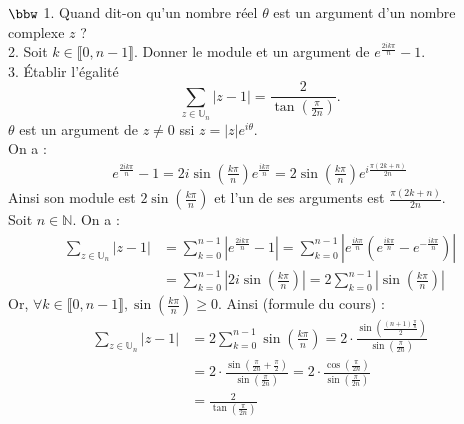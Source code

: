 \documentclass[11pt]{article}
\begin{document}
\pagebreak

\begin{exercice}{$\bbw$}{}
    1. Quand dit-on qu'un nombre réel $\theta$ est un argument d'un nombre complexe $z$ ?\\
    2. Soit $k\in\llbracket0,n-1\rrbracket$. Donner le module et un argument de $e^{\frac{2ik\pi}{n}}-1$.\\
    3. Établir l'égalité
    \begin{equation*}
        \sum_{z\in\mathbb{U}_n}{|z-1|}=\frac{2}{\tan\left( \frac{\pi}{2n} \right)}.
    \end{equation*}
    \tcblower
     $\theta$ est un argument de $z\neq0$ ssi $z=|z|e^{i\theta}$.\\
     On a :
    \begin{align*}
        e^{\frac{2ik\pi}{n}}-1=2i\sin\left( \frac{k\pi}{n} \right)e^{\frac{ik\pi}{n}}=2\sin\left( \frac{k\pi}{n} \right)e^{i\frac{\pi(2k+n)}{2n}}
    \end{align*}
    Ainsi son module est $2\sin\left( \frac{k\pi}{n} \right)$ et l'un de ses arguments est $\frac{\pi(2k+n)}{2n}$.\\
     Soit $n\in\mathbb{N}$. On a :
    \begin{align*}
        \sum_{z\in\mathbb{U}_n}{|z-1|}&=\sum_{k=0}^{n-1}{|e^{\frac{2ik\pi}{n}}-1|} = \sum_{k=0}^{n-1}{|e^{\frac{ik\pi}{n}}\left( e^{\frac{ik\pi}{n}} - e^{-\frac{ik\pi}{n}} \right)|}\\
        &=\sum_{k=0}^{n-1}{\left|2i\sin\left( \frac{k\pi}{n} \right)\right|} = 2\sum_{k=0}^{n-1}{\left|\sin\left( \frac{k\pi}{n} \right)\right|}
    \end{align*}
    Or, $\forall{k\in\llbracket0,n-1\rrbracket}, \sin\left( \frac{k\pi}{n} \right) \geq 0$. Ainsi (formule du cours) :
    \begin{align*}
        \sum_{z\in\mathbb{U}_n}{|z-1|} &= 2\sum_{k=0}^{n-1}{\sin\left( \frac{k\pi}{n} \right)} = 2 \cdot \frac{ \sin \left( \frac{(n+1) \frac{\pi}{n}}{2} \right)}{\sin \left( \frac{\pi}{2n} \right)}\\
        &= 2 \cdot \frac{\sin\left( \frac{\pi}{2n} + \frac{\pi}{2} \right)}{\sin \left( \frac{\pi}{2n} \right)} = 2 \cdot \frac{\cos\left( \frac{\pi}{2n} \right)}{\sin\left( \frac{\pi}{2n} \right)}\\
        &= \frac{2}{\tan\left( \frac{\pi}{2n} \right)}
    \end{align*}
\end{exercice}
\end{document}
